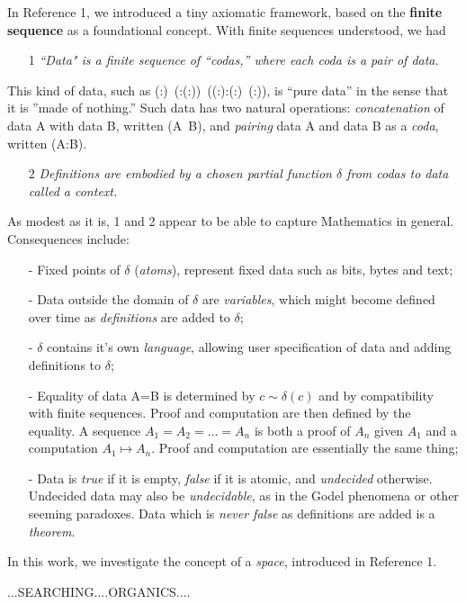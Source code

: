 \documentclass[11pt]{article}
\begin{document}
In Reference 1, we introduced a tiny axiomatic framework, based on the {\bf finite sequence} as a foundational concept.  
With finite sequences understood, we had 
\begin{itemize}
\item[1 ]{\it ``Data" is a finite sequence of ``codas,'' where each coda is a pair of data.}
\end{itemize}
\noindent This kind of data, such as (:)\ (:(:))\ ((:):(:)\ (:)), is ``pure data'' in the sense that it is ''made of nothing.'' Such data has two natural operations: 
{\it concatenation} of data A with data B, written (A\ B), and {\it pairing} data A and data B as a {\it coda}, written (A:B).  
\begin{itemize}
\item[2 ]{\it Definitions are embodied by a chosen partial function $\delta$ from codas to data called a context.}
\end{itemize}
As modest as it is, 1 and 2 appear to be able to capture Mathematics in general.  Consequences include:   
\begin{itemize}
\item[-]{Fixed points of $\delta$ ({\it atoms}), represent fixed data such as bits, bytes and text;}
\item[-]{Data outside the domain of $\delta$ are {\it variables}, which might become defined over time as {\it definitions} are added to $\delta$;} 
\item[-]{$\delta$ contains it's own {\it language}, allowing user specification of data and adding definitions to $\delta$;} 
\item[-]{Equality of data A=B is determined by $c\sim\delta(c)$ and by compatibility with finite sequences. Proof and computation are then defined by the equality.  A sequence $A_1=A_2=\dots=A_n$ is both a proof of $A_n$ given $A_1$ and a computation $A_1\mapsto A_n$.  Proof and computation are essentially the same thing;}
\item[-]{Data is {\it true} if it is empty, {\it false} if it is atomic, and {\it undecided} otherwise.  Undecided data may also be {\it undecidable}, as in the Godel phenomena or other seeming paradoxes.  Data which is {\it never false} as definitions are added is a {\it theorem}.}
\end{itemize}

In this work, we investigate the concept of a {\it space}, introduced in Reference 1.  


...SEARCHING....ORGANICS....
\end{document}
